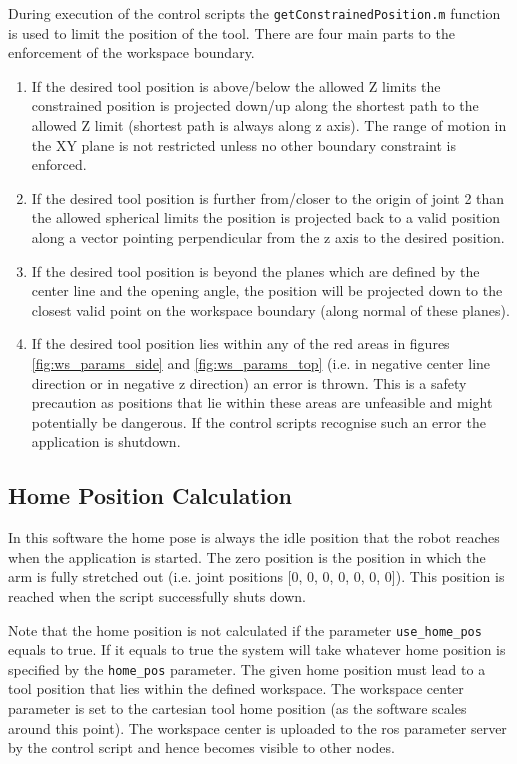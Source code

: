 \documentclass[headsepline,footinclude=false,fontsize=11pt,paper=a4,listof=totoc,bibliography=totoc,BCOR=12mm,DIV=14]{scrbook}
\begin{document}
During execution of the control scripts the \texttt{getConstrainedPosition.m} function is used to limit the position of the tool. There are four main parts to the enforcement of the workspace boundary. 
\begin{enumerate}
	\item If the desired tool position is above/below the allowed Z limits the constrained position is projected down/up along the shortest path to the allowed Z limit (shortest path is always along z axis). The range of motion in the XY plane is not restricted unless no other boundary constraint is enforced.
	\item If the desired tool position is further from/closer to the origin of joint 2 than the allowed spherical limits the position is projected back to a valid position along a vector pointing perpendicular from the z axis to the desired position.
	\item If the desired tool position is beyond the planes which are defined by the center line and the opening angle, the position will be projected down to the closest valid point on the workspace boundary (along normal of these planes).
	\item If the desired tool position lies within any of the red areas in figures \ref{fig:ws_params_side} and \ref{fig:ws_params_top} (i.e. in negative center line direction or in negative z direction) an error is thrown. This is a safety precaution as positions that lie within these areas are unfeasible and might potentially be dangerous. If the control scripts recognise such an error the application is shutdown.
\end{enumerate}

\newpage

\subsection{Home Position Calculation}\label{home_calc}

In this software the home pose is always the idle position that the robot reaches when the application is started. The zero position is the position in which the arm is fully stretched out (i.e. joint positions [0, 0, 0, 0, 0, 0, 0]). This position is reached when the script successfully shuts down.

Note that the home position is not calculated if the parameter \texttt{use\_home\_pos} equals to true. If it equals to true the system will take whatever home position is specified by the \texttt{home\_pos} parameter. The given home position must lead to a tool position that lies within the defined workspace. The workspace center parameter is set to the cartesian tool home position (as the software scales around this point). The workspace center is uploaded to the \gls{ros} parameter server by the control script and hence becomes visible to other nodes.
\end{document}
